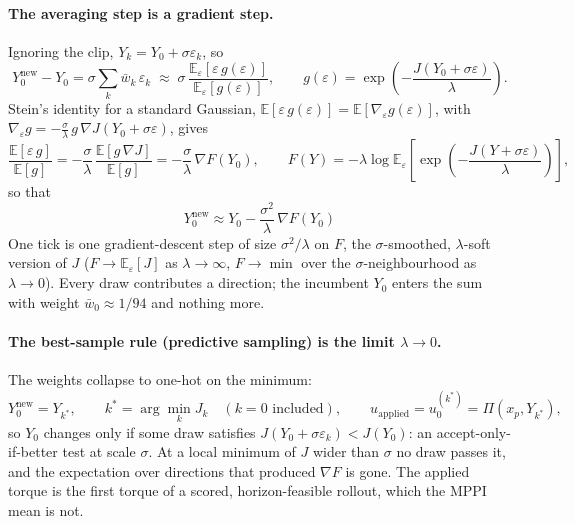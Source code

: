 \paragraph{The averaging step is a gradient step.}
Ignoring the clip, $Y_k = Y_0 + \sigma \varepsilon_k$, so
\begin{equation}
  Y_0^{\mathrm{new}} - Y_0 = \sigma \sum_k \bar w_k\, \varepsilon_k
  \;\approx\; \sigma\, \frac{\mathbb{E}_\varepsilon\!\left[\varepsilon\, g(\varepsilon)\right]}{\mathbb{E}_\varepsilon\!\left[g(\varepsilon)\right]},
  \qquad g(\varepsilon) = \exp\!\left(-\frac{J(Y_0 + \sigma\varepsilon)}{\lambda}\right).
\end{equation}
Stein's identity for a standard Gaussian, $\mathbb{E}[\varepsilon\, g(\varepsilon)] = \mathbb{E}[\nabla_\varepsilon g(\varepsilon)]$,
with $\nabla_\varepsilon g = -\frac{\sigma}{\lambda}\, g\, \nabla J(Y_0 + \sigma\varepsilon)$, gives
\begin{equation}
  \frac{\mathbb{E}[\varepsilon\, g]}{\mathbb{E}[g]}
  = -\frac{\sigma}{\lambda}\, \frac{\mathbb{E}\!\left[g\, \nabla J\right]}{\mathbb{E}[g]}
  = -\frac{\sigma}{\lambda}\, \nabla F(Y_0),
  \qquad
  F(Y) = -\lambda \log \mathbb{E}_\varepsilon\!\left[\exp\!\left(-\frac{J(Y + \sigma\varepsilon)}{\lambda}\right)\right],
\end{equation}
so that
\begin{equation}
  \boxed{\; Y_0^{\mathrm{new}} \approx Y_0 - \frac{\sigma^2}{\lambda}\, \nabla F(Y_0) \;}
\end{equation}
One tick is one gradient-descent step of size $\sigma^2/\lambda$ on $F$, the $\sigma$-smoothed, $\lambda$-soft version of $J$
($F \to \mathbb{E}_\varepsilon[J]$ as $\lambda \to \infty$, $F \to \min$ over the $\sigma$-neighbourhood as $\lambda \to 0$).
Every draw contributes a direction; the incumbent $Y_0$ enters the sum with weight $\bar w_0 \approx 1/94$ and nothing more.

\paragraph{The best-sample rule (predictive sampling) is the limit $\lambda \to 0$.}
The weights collapse to one-hot on the minimum:
\begin{equation}
  Y_0^{\mathrm{new}} = Y_{k^*}, \qquad k^* = \arg\min_k J_k \quad (k = 0 \text{ included}), \qquad
  u_{\mathrm{applied}} = u_0^{(k^*)} = \Pi\!\left(x_p, Y_{k^*}\right),
\end{equation}
so $Y_0$ changes only if some draw satisfies $J(Y_0 + \sigma\varepsilon_k) < J(Y_0)$: an accept-only-if-better test at scale
$\sigma$. At a local minimum of $J$ wider than $\sigma$ no draw passes it, and the expectation over directions that
produced $\nabla F$ is gone. The applied torque is the first torque of a scored, horizon-feasible rollout, which the
MPPI mean is not.
